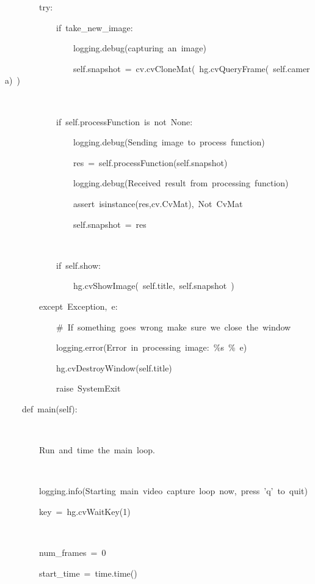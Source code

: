 \documentclass[english]{IEEEtran}
\theoremstyle{plain}
\newenvironment{lyxcode}
{\par\begin{list}{}{
\setlength{\rightmargin}{\leftmargin}
\setlength{\listparindent}{0pt}%
\raggedright
\setlength{\itemsep}{0pt}
\setlength{\parsep}{0pt}
\normalfont\ttfamily}%
 \item[]}
{\end{list}}
\begin{document}
\begin{algorithm*}
\begin{lyxcode}
~~~~~~~~try:

~~~~~~~~~~~~if~take\_new\_image:

~~~~~~~~~~~~~~~~logging.debug(\textquotedbl{}capturing~an~image\textquotedbl{})

~~~~~~~~~~~~~~~~self.snapshot~=~cv.cvCloneMat(~hg.cvQueryFrame(~self.camera)~)

~~~~~~~

~~~~~~~~~~~~if~self.processFunction~is~not~None:

~~~~~~~~~~~~~~~~logging.debug(\textquotedbl{}Sending~image~to~process~function\textquotedbl{})

~~~~~~~~~~~~~~~~res~=~self.processFunction(self.snapshot)

~~~~~~~~~~~~~~~~logging.debug(\textquotedbl{}Received~result~from~processing~function\textquotedbl{})

~~~~~~~~~~~~~~~~assert~isinstance(res,cv.CvMat),~\textquotedbl{}Not~CvMat\textquotedbl{}

~~~~~~~~~~~~~~~~self.snapshot~=~res

~~~~~~~~~~~~~~~~~~~~~~~

~~~~~~~~~~~~if~self.show:

~~~~~~~~~~~~~~~~hg.cvShowImage(~self.title,~self.snapshot~)

~~~~~~~~except~Exception,~e:

~~~~~~~~~~~~\#~If~something~goes~wrong~make~sure~we~close~the~window

~~~~~~~~~~~~logging.error(\textquotedbl{}Error~in~processing~image:~\%s\textquotedbl{}~\%~e)

~~~~~~~~~~~~hg.cvDestroyWindow(self.title)

~~~~~~~~~~~~raise~SystemExit



~~~~def~main(self):

~~~~~~~~\textquotedbl{}\textquotedbl{}\textquotedbl{}

~~~~~~~~Run~and~time~the~main~loop.

~~~~~~~~\textquotedbl{}\textquotedbl{}\textquotedbl{}

~~~~~~~~logging.info(\textquotedbl{}Starting~main~video~capture~loop~now,~press~'q'~to~quit\textquotedbl{})

~~~~~~~~key~=~hg.cvWaitKey(1)

~~~~~~~~

~~~~~~~~num\_frames~=~0

~~~~~~~~start\_time~=~time.time()

~~~~~~~~


\end{lyxcode}
\end{algorithm*}
\end{document}
